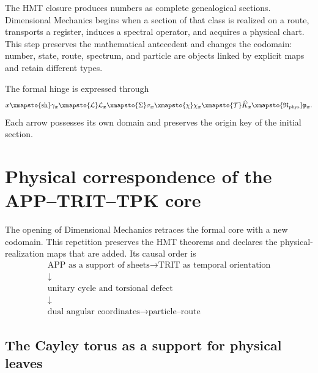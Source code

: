 \label{chap:realizacion-espectral-numero-particula}

The HMT closure produces numbers as complete genealogical sections.
Dimensional Mechanics begins when a section of that class is realized on
a route, transports a register, induces a spectral operator, and acquires a
physical chart. This step preserves the mathematical antecedent and changes the
codomain: number, state, route, spectrum, and particle are objects linked
by explicit maps and retain different types.

The formal hinge is expressed through
\begin{equation}
 \boldsymbol x
 \xmapsto{\operatorname{sh}}
 \gamma_{\boldsymbol x}
 \xmapsto{\mathcal L}
 \mathcal L_{\boldsymbol x}
 \xmapsto{\Sigma}
 \sigma_{\boldsymbol x}
 \xmapsto{\chi}
 \chi_{\boldsymbol x}
 \xmapsto{\mathcal T}
 \widehat K_{\boldsymbol x}
 \xmapsto{\mathfrak R_{\rm phys}}
 \mathfrak p_{\boldsymbol x}.
 \label{eq:bisagra-numero-espectro-particula}
\end{equation}
Each arrow possesses its own domain and preserves the origin key of the initial section.

\section{Physical correspondence of the APP--TRIT--TPK core}
\label{sec:reaplicacion-fisica-app-trit-tpk}

The opening of Dimensional Mechanics retraces the formal core with
a new codomain. This repetition preserves the HMT theorems and declares
the physical-realization maps that are added. Its causal order is
\[
 \boxed{\begin{gathered}
 \text{APP as a support of sheets}
 \longrightarrow \text{TRIT as temporal orientation}\\
 \downarrow\\[-1mm]
 \text{unitary cycle and torsional defect}\\
 \downarrow\\[-1mm]
 \text{dual angular coordinates}
 \longrightarrow \text{particle--route}
 \end{gathered}}
\]

\subsection{The Cayley torus as a support for physical leaves}

